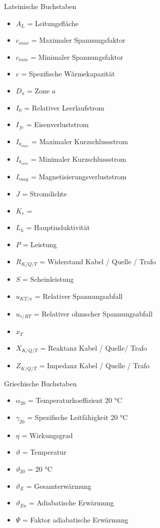 \documentclass[11pt, a4paper, draft, fleqn, twocolumn]{article}
\numberwithin{equation}{subsection}
\begin{document}
Lateinische Buchstaben
\begin{itemize}
    \item \(A_L\) = Leitungsfläche
    \item \(c_{max}\) = Maximaler Spannungsfaktor
    \item \(c_{min}\) = Minimaler Spannungsfaktor
    \item \(c\) = Spezifische Wärmekapazität
    \item \(D_a\) = Zone \(a\)
    \item \(I_0\) = Relativer Leerlaufstrom
    \item \(I_{fe}\) = Eisenverluststrom
    \item \(I_{k_{max}}\) = Maximaler Kurzschlussstrom
    \item \(I_{k_{min}}\) = Minimaler Kurzschlussstrom
    \item \(I_{mag}\) = Magnetisierungsverluststrom
    \item \(J\) = Stromdichte
    \item \(K_r\) =
    \item \(L_h\) = Hauptinduktivität
    \item \(P\) = Leistung
    \item \(R_{K/Q/T}\) = Widerstand Kabel / Quelle / Trafo
    \item \(S\) = Scheinleistung
    \item \(u_{KT/x}\) = Relativer Spannungsabfall
    \item \(u_{r/RT}\) = Relativer ohmscher Spannungsabfall
    \item \(x_T\)
    \item \(X_{K/Q/T}\) = Reaktanz Kabel / Quelle/ Trafo
    \item \(Z_{K/Q/T}\) = Impedanz Kabel / Quelle / Trafo
\end{itemize}

\noindent Griechische Buchstaben
\begin{itemize}
    \item \(\alpha_{20}\) = Temperaturkoeffizient 20 °C
    \item \(\gamma_{20}\) = Spezifische Leitfähigkeit 20 °C
    \item \(\eta\) = Wirkungsgrad
    \item \(\vartheta\) = Temperatur
    \item \(\vartheta_{20}\) = 20 °C
    \item \(\vartheta_{E}\) = Gesamterwärmung
    \item \(\vartheta_{Ea}\) = Adiabatische Erwärmung
    \item \(\Psi\) = Faktor adiabatische Erwärmung
\end{itemize}
\end{document}
